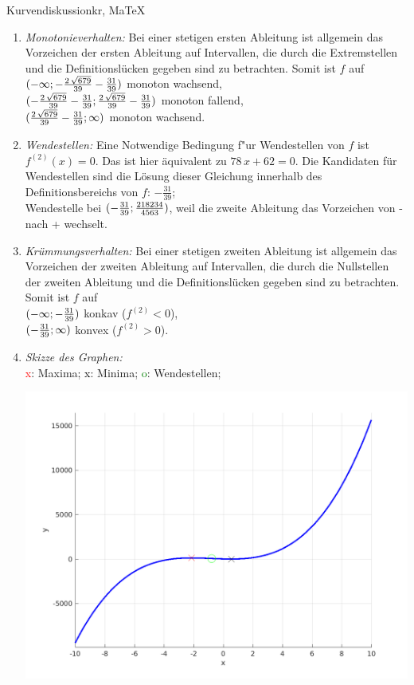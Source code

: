 \begin{MAufgabe}{Kurvendiskussion}{kr, MaTeX}
\begin{enumerate}
 \item \emph{Monotonieverhalten:} 
 Bei einer stetigen ersten Ableitung ist allgemein das Vorzeichen der ersten Ableitung auf Intervallen, die durch die Extremstellen und die Definitionsl\"ucken gegeben sind zu betrachten. Somit ist $f$ auf \\ 
 $(-\infty; - \frac{2\, \sqrt{679}}{39} - \frac{31}{39})$ monoton wachsend, \\ 
 $( - \frac{2\, \sqrt{679}}{39} - \frac{31}{39};\frac{2\, \sqrt{679}}{39} - \frac{31}{39})$ monoton  fallend, \\ 
 $(\frac{2\, \sqrt{679}}{39} - \frac{31}{39}; \infty)$ monoton wachsend. \\ 
 \item \emph{Wendestellen:} 
 Eine Notwendige Bedingung f"ur Wendestellen von $f$ ist $f^{(2)}(x)=0$. 
 Das ist hier \"aquivalent zu $78\, x + 62=0$. 
 Die Kandidaten f\"ur Wendestellen sind die L\"osung dieser Gleichung innerhalb des Definitionsbereichs von $f$: $- \frac{31}{39}$; \\ 
 Wendestelle bei $(- \frac{31}{39};\frac{218234}{4563})$, weil die zweite Ableitung das Vorzeichen von - nach + wechselt. \\ 
 \item \emph{Kr\"ummungsverhalten:} 
 Bei einer stetigen zweiten Ableitung ist allgemein das Vorzeichen der zweiten Ableitung auf Intervallen, die durch die Nullstellen der zweiten Ableitung und die Definitionsl\"ucken gegeben sind zu betrachten. 
 Somit ist $f$ auf \\ 
 $(-\infty ;- \frac{31}{39})$  konkav ($f^{(2)}<0$), \\ 
 $(- \frac{31}{39}; \infty)$  konvex ($f^{(2)}>0$). \\ 
 \item \emph{Skizze des Graphen:} \\ 
 {\textcolor{red} x}: Maxima; {\textcolor{black} x}: Minima; {\textcolor{green} o}: Wendestellen; 
  \begin{center}
  \includegraphics[width=0.8\linewidth]{Abb_zur_Ag_autogenerated_fractions_45.png} \end{center}
  
 \end{enumerate}
 \else\relax\fi
  \end{MAufgabe}
